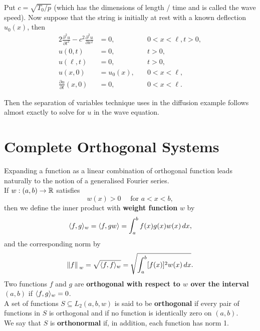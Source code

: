 Put \(c = \sqrt{T_0 / p}\) (which has the dimensions of length / time and is called the wave speed). Now suppose that the string is initially at rest with a known deflection \(u_0(x)\), then
\begin{alignat*}{2}
    \frac{\partial^2 u}{\partial t^2} - c^2 \frac{\partial^2 u }{\partial x^2} & = 0, \quad      & 0 <x < \ell, t > 0, \\
    u(0, t)                                                                    & = 0, \quad      & t> 0,               \\
    u(\ell, t)                                                                 & = 0, \quad      & t > 0,              \\
    u(x, 0)                                                                    & = u_0(x), \quad & 0 < x < \ell,       \\
    \frac{\partial u}{\partial t}(x, 0)                                        & = 0, \quad      & 0 < x < \ell.
\end{alignat*}

Then the separation of variables technique uses in the diffusion example follows almost exactly to solve for \(u\) in the wave equation.

\section{Complete Orthogonal Systems}
Expanding a function as a linear combination of orthogonal function leads naturally to the notion of a generalised Fourier series. \\

If \(w : (a,b) \to \mathbb{R}\) satisfies
\[w(x) > 0 \quad \text{ for } a < x < b,\]
then we define the inner product with \textbf{weight function} \(w\) by
\[\langle f, g \rangle_w = \langle f, gw \rangle = \int_a^b f(x)g(x)w(x) \, dx,\]
and the corresponding norm by
\[\norm*{f}_w = \sqrt{\langle f, f \rangle_w} = \sqrt{\int_a^b [f(x)]^2w(x) \, dx}.\]
Two functions \(f\) and \(g\) are \textbf{orthogonal with respect to \(w\) over the interval \((a, b)\)} if \(\langle f, g \rangle_w = 0\). \\

A set of functions \(S \subseteq L_2(a, b, w)\) is said to be \textbf{orthogonal} if every pair of functions in \(S\) is orthogonal and if no function is identically zero on \((a, b)\). \\

We say that \(S\) is \textbf{orthonormal} if, in addition, each function has norm 1.

